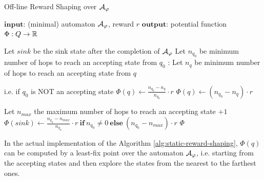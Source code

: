 \begin{algorithm}
	\caption{Off-line Reward Shaping over $\mathcal{A}_{\varphi}$}
	\label{alg:static-reward-shaping}
	\begin{algorithmic}[1]
		\State $\mathbf{input}$: (minimal) automaton $\mathcal{A}_\varphi$, reward $r$
		\State $\mathbf{output}$: potential function $\Phi: Q\to \mathbb{R}$
		
		\State Let $sink$ be the sink state after the completion of $\mathcal{A}_{\varphi}$
		\State Let $n_{q_0}$ be minimum number of hops to reach an accepting state from $q_0$ \label{alg-line:q0-distance}
		:
			\State Let $n_q$ be minimum number of hops to reach an accepting state from $q$ \label{alg-line:q-distance}
			
			 \Comment i.e. if $q_0$ is NOT an accepting state
				\State $\Phi(q) \gets \frac{n_{q_0} - n_q}{n_{q_0}} \cdot r$
			\Else	
				\State $\Phi(q) \gets (n_{q_0} - n_q) \cdot r$
			\EndIf

		\EndFor
		
		\State Let $n_{max}$ the maximum number of hops  to reach an accepting state $+1$ \label{alg-line:max-distance} 
		\State $\Phi(sink) \gets \frac{n_{q_0} - n_{max}}{n_{q_0}} \cdot r \ \mathbf{if}\  n_{q_0}\neq 0 \ \mathbf{else}\  (n_{q_0} - n_{max}) \cdot r$ 
		\State \Return $\Phi$
 	\end{algorithmic}

\end{algorithm}

In the actual implementation of the Algorithm
 \ref{alg:static-reward-shaping}, $\Phi(q)$ can be computed by a least-fix point over the automaton $\mathcal{A}_\varphi$, i.e. starting from the accepting states and then explore the states from the nearest to the farthest ones.

